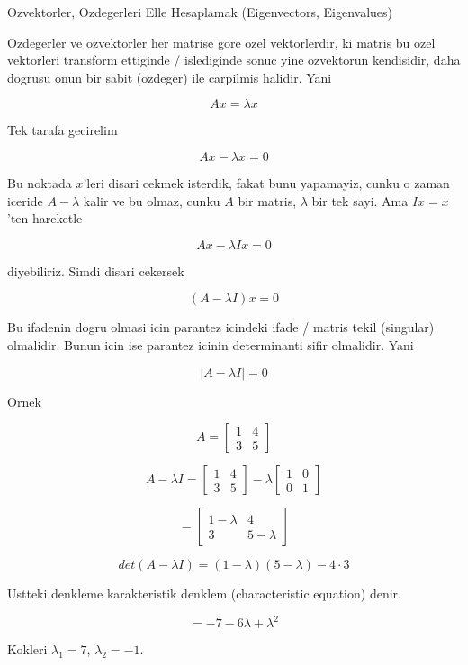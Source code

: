 \documentclass[12pt,fleqn]{article}
\begin{document}
Ozvektorler, Ozdegerleri Elle Hesaplamak (Eigenvectors, Eigenvalues)

Ozdegerler ve ozvektorler her matrise gore ozel vektorlerdir, ki matris bu
ozel vektorleri transform ettiginde / islediginde sonuc yine ozvektorun
kendisidir, daha dogrusu onun bir sabit (ozdeger) ile carpilmis
halidir. Yani

\[ Ax = \lambda x \]

Tek tarafa gecirelim

\[ Ax - \lambda x = 0 \]

Bu noktada $x$'leri disari cekmek isterdik, fakat bunu yapamayiz, cunku o
zaman iceride $A - \lambda$ kalir ve bu olmaz, cunku $A$ bir matris,
$\lambda$ bir tek sayi. Ama $Ix = x$'ten hareketle

\[ Ax - \lambda I x = 0 \]

diyebiliriz. Simdi disari cekersek

\[ (A - \lambda I) x = 0 \]

Bu ifadenin dogru olmasi icin parantez icindeki ifade / matris tekil
(singular) olmalidir. Bunun icin ise parantez icinin determinanti sifir
olmalidir. Yani

\[ |A - \lambda I| = 0 \]

Ornek 

\[ 
A = 
\left[\begin{array}{rr}
1 & 4 \\ 3 & 5
\end{array}\right]
 \]

\[ 
A - \lambda I = 
\left[\begin{array}{rr}
1 & 4 \\ 3 & 5
\end{array}\right] - 
\lambda
\left[\begin{array}{rr}
1 & 0 \\ 0 & 1
\end{array}\right] 
 \]

\[ 
= 
\left[\begin{array}{rr}
1 - \lambda & 4 \\ 3 & 5-\lambda
\end{array}\right]
 \]

\[ det(A - \lambda I) = (1-\lambda)(5-\lambda) - 4 \cdot 3 \]

Ustteki denkleme karakteristik denklem (characteristic equation) denir. 

\[ = -7 -6\lambda + \lambda^2 \]

Kokleri $\lambda_1 = 7$, $\lambda_2 = -1$.
\end{document}
